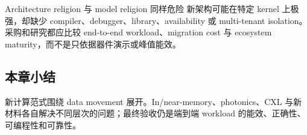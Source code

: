 \begin{warningbox}{Architecture religion 与 model religion 同样危险}
新架构可能在特定 kernel 上极强，却缺少 compiler、debugger、library、availability 或 multi-tenant isolation。采购和研究都应比较 end-to-end workload、migration cost 与 ecosystem maturity，而不是只依据器件演示或峰值能效。
\end{warningbox}


\subsection{本章小结}

新计算范式围绕 data movement 展开。In/near-memory、photonics、CXL 与新材料各自解决不同层次的问题；最终验收仍是端到端 workload 的能效、正确性、可编程性和可靠性。

